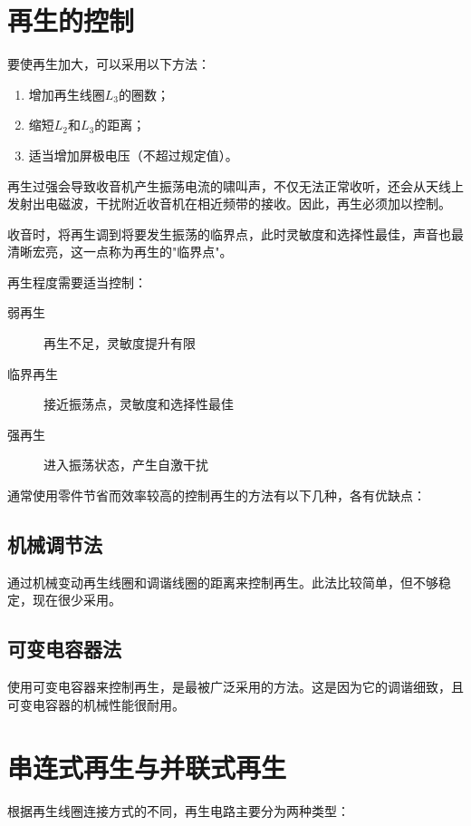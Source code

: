 \documentclass[12pt,UTF8]{ctexbook}
\begin{document}
\section{再生的控制}

要使再生加大，可以采用以下方法：
\begin{enumerate}
    \item 增加再生线圈$L_3$的圈数；
    \item 缩短$L_2$和$L_3$的距离；
    \item 适当增加屏极电压（不超过规定值）。
\end{enumerate}

再生过强会导致收音机产生振荡电流的啸叫声，不仅无法正常收听，还会从天线上发射出电磁波，干扰附近收音机在相近频带的接收。因此，再生必须加以控制。

收音时，将再生调到将要发生振荡的临界点，此时灵敏度和选择性最佳，声音也最清晰宏亮，这一点称为再生的"临界点"。

再生程度需要适当控制：

\begin{description}
    \item[弱再生] 再生不足，灵敏度提升有限
    \item[临界再生] 接近振荡点，灵敏度和选择性最佳
    \item[强再生] 进入振荡状态，产生自激干扰
\end{description}

通常使用零件节省而效率较高的控制再生的方法有以下几种，各有优缺点：

\subsection{机械调节法}

通过机械变动再生线圈和调谐线圈的距离来控制再生。此法比较简单，但不够稳定，现在很少采用。

\subsection{可变电容器法}

使用可变电容器来控制再生，是最被广泛采用的方法。这是因为它的调谐细致，且可变电容器的机械性能很耐用。

\section{串连式再生与并联式再生}

根据再生线圈连接方式的不同，再生电路主要分为两种类型：
\end{document}
